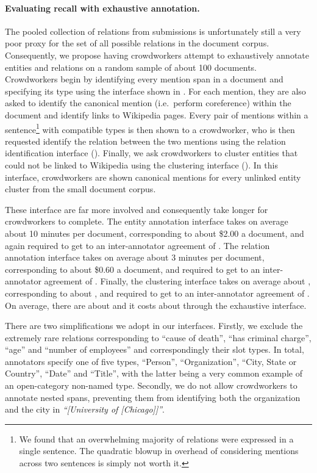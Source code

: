 \paragraph{Evaluating recall with exhaustive annotation.}
The pooled collection of relations from submissions is unfortunately still a very poor proxy for the set of all possible relations in the document corpus.
Consequently, we propose having crowdworkers attempt to exhaustively annotate entities and relations on a random sample of about 100 documents.
Crowdworkers begin by identifying every mention span in a document and specifying its type using the interface shown in . For each mention, they are also asked to identify the canonical mention (i.e.\ perform coreference) within the document and identify links to Wikipedia pages.
Every pair of mentions within a sentence\footnote{
  We found that an overwhelming majority of relations were expressed in a single sentence.
  The quadratic blowup in overhead of considering mentions across two sentences is simply not worth it.}
  with compatible types is then shown to a crowdworker, who is then requested identify the relation between the two mentions using the relation identification interface ().
  Finally, we ask crowdworkers to cluster entities that could not be linked to Wikipedia using the clustering interface ().
  In this interface, crowdworkers are shown canonical mentions for every unlinked entity cluster from the small document corpus.

These interface are far more involved and consequently take longer for crowdworkers to complete.
The entity annotation interface takes on average about 10 minutes per document, corresponding to about \$2.00 a document, and 
again required  to get to an inter-annotator agreement of .
The relation annotation interface takes on average about 3 minutes per document, corresponding to about \$0.60 a document, and required  to get to an inter-annotator agreement of .
Finally, the clustering interface takes on average about , corresponding to about , and required  to get to an inter-annotator agreement of .
On average, there are about  and it costs about  through the exhaustive interface.

There are two simplifications we adopt in our interfaces.
Firstly, we exclude the extremely rare relations corresponding to ``cause of death'', ``has criminal charge'', ``age'' and ``number of employees'' and correspondingly their slot types.
In total, annotators specify one of five types, ``Person'', ``Organization'', ``City, State or Country'', ``Date'' and ``Title'', with the latter being a very common example of an open-category non-named type.
Secondly, we do not allow crowdworkers to annotate nested spans, preventing them from identifying both the organization and the city in \textit{``[University of [Chicago]]''}. 

